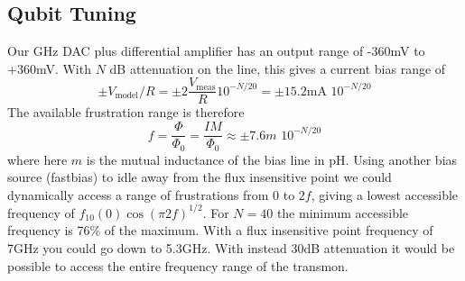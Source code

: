 \documentclass[twocolumn]{article}
\begin{document}
\subsection{Qubit Tuning}
Our GHz DAC plus differential amplifier has an output range of -360mV to +360mV. With $N$ dB attenuation on the line, this gives a current bias range of \begin{equation}
\pm V_{\textrm{model}}/R = \pm 2 \frac{V_{\textrm{meas}}}{R} 10^{-N/20} = \pm 15.2\textrm{mA}\,\,10^{-N/20} \end{equation}
The available frustration range is therefore \begin{equation}
f = \frac{\Phi}{\Phi_0} = \frac{IM}{\Phi_0} \approx \pm 7.6 m\,\, 10^{-N/20} \end{equation}
where here $m$ is the mutual inductance of the bias line in pH. Using another bias source (fastbias) to idle away from the flux insensitive point we could dynamically access a range of frustrations from 0 to $2f$, giving a lowest accessible frequency of $f_{10}(0) \cos \left( \pi 2f \right)^{1/2}$.  For $N=40$ the minimum accessible frequency is 76\% of the maximum. With a flux insensitive point frequency of 7GHz you could go down to 5.3GHz. With instead 30dB attenuation it would be possible to access the entire frequency range of the transmon.
\end{document}
